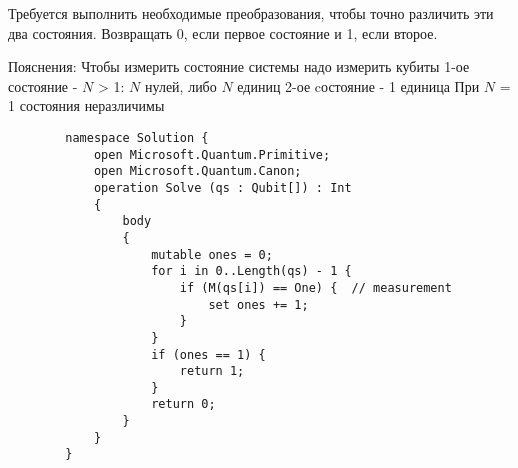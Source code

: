 \documentclass{article}
\begin{document}
    Требуется выполнить необходимые преобразования, чтобы точно различить эти два состояния. Возвращать $0$, если первое состояние и 1, если второе. 
    
    Пояснения:
Чтобы измерить состояние системы надо измерить кубиты
1-ое состояние - $N$ > 1: $N$ нулей, либо $N$ единиц
2-ое cостояние - 1 единица
При $N$ = 1 состояния неразличимы

    \begin{lstlisting}
        namespace Solution {
            open Microsoft.Quantum.Primitive;
            open Microsoft.Quantum.Canon;
            operation Solve (qs : Qubit[]) : Int 
            {
                body
                {
                    mutable ones = 0;
                    for i in 0..Length(qs) - 1 {
                        if (M(qs[i]) == One) {  // measurement
                            set ones += 1;
                        }
                    }
                    if (ones == 1) {
                        return 1;
                    }
                    return 0;
                }
            }
        }
    \end{lstlisting}
\end{document}

